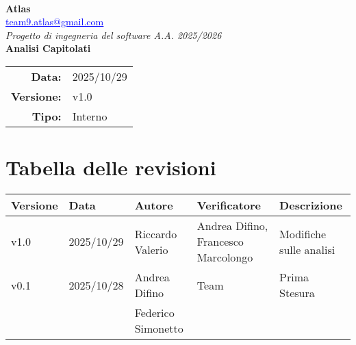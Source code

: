 \documentclass[a4paper,12pt]{article}
\makeatletter
\newcommand{\Gruppo}{Atlas}
\newcommand{\Email}{\href{mailto:team9.atlas@gmail.com}{\textcolor{blue}{\underline{team9.atlas@gmail.com}}}}
\newcommand{\Titolo}{Analisi Capitolati}
\newcommand{\DataModifica}{2025/10/29}
\newcommand{\LogoGruppo}{img/AtlasLogo.png} %
\newcommand{\VersioneVerbale}{v1.0} %
\newcommand{\Interno}{Interno}
\makeatother
\begin{document}
\begin{titlepage}
    \centering

    \vspace*{0cm}
    \\[0.8cm]

    {\LARGE \textbf{\Gruppo}}\\[0.1cm]
    {\large \Email}\\[1.2cm]

    {\Large \textit{Progetto di ingegneria del software A.A. 2025/2026}}\\[1.5cm]

    {\Huge \textbf{\Titolo}}\\[1.5cm]

    \begin{tabular}{rl}
        \textbf{Data:} & \DataModifica \\
        \textbf{Versione:} & \VersioneVerbale \\
        \textbf{Tipo:} & \Interno \\
    \end{tabular}

\end{titlepage}


\section*{Tabella delle revisioni}{
    \begin{center} 
        \begin{tabular}{|l|l|l|l|l|}
            \hline
            \textbf{Versione} & \textbf{Data} & \textbf{Autore} & \textbf{Verificatore} & \textbf{Descrizione} \\
            \hline
            v1.0& 2025/10/29 & Riccardo Valerio & Andrea Difino, Francesco Marcolongo & Modifiche sulle analisi \\
            \hline
            v0.1 & 2025/10/28 & Andrea Difino & Team & Prima Stesura \\
            && Federico Simonetto &&\\
            \hline
            
        \end{tabular}
    \end{center}
}
\end{document}
